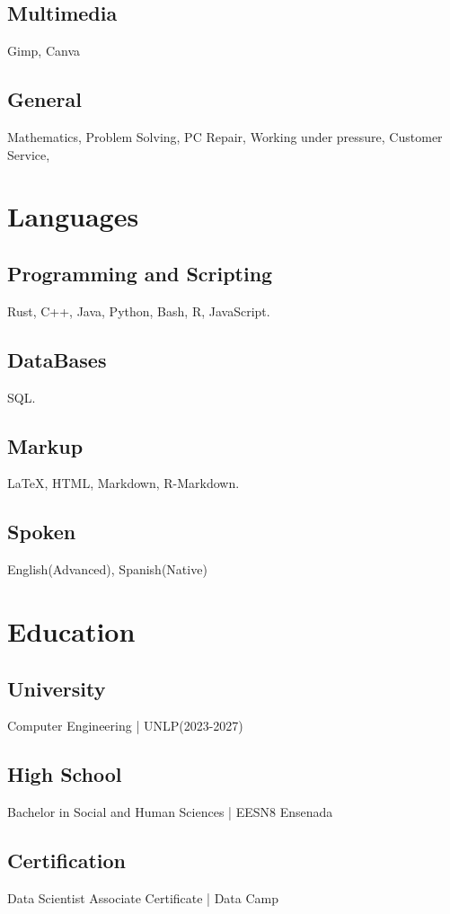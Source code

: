 \documentclass{article}
\begin{document}
\subsection{Multimedia}
Gimp, Canva
\subsection{General}
Mathematics,
Problem Solving, PC Repair,
Working under pressure, Customer Service,

\section{Languages}
\subsection{Programming and Scripting}
Rust,  C++, Java, Python, Bash, R, JavaScript.
\subsection{DataBases}
SQL.
\subsection{Markup}
{\LaTeX}, HTML, Markdown, R-Markdown.
\subsection{Spoken}
English(Advanced), Spanish(Native)
\section{Education}
\subsection{University}
Computer Engineering | UNLP(2023-2027)\
\subsection{High School}
Bachelor in Social and Human Sciences | EESN8 Ensenada
\subsection{Certification}
Data Scientist Associate Certificate | Data Camp
\end{document}

